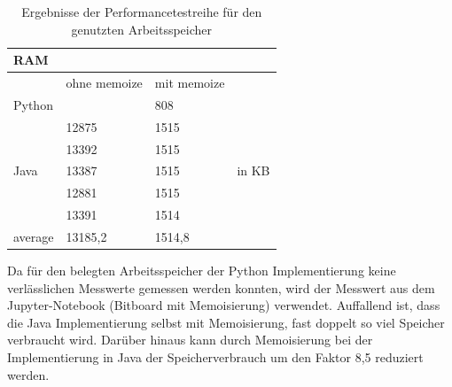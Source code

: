 \begin{table}[H]
    \centering
    \begin{tabular}{|l|ll|l|}
        \hline
        \multicolumn{4}{|l|}{\textbf{RAM}}                                             \\ \hline
                                & ohne memoize & mit memoize &                         \\ \hline
        \multirow{1}{*}{Python} &              & 808         & \multirow{7}{*}{in KB}  \\ \cline{1-3}
        \multirow{5}{*}{Java}   & 12875        & 1515        &                         \\
                                & 13392        & 1515        &                         \\
                                & 13387        & 1515        &                         \\
                                & 12881        & 1515        &                         \\
                                & 13391        & 1514        &                         \\ \cline{1-3}
        average                 & 13185,2      & 1514,8      &                         \\ \hline
    \end{tabular}
    \caption{Ergebnisse der Performancetestreihe für den genutzten Arbeitsspeicher}
\end{table}

Da für den belegten Arbeitsspeicher der Python Implementierung keine verlässlichen Messwerte gemessen werden 
konnten, wird der Messwert aus dem Jupyter-Notebook (Bitboard mit Memoisierung) verwendet. Auffallend ist, 
dass die Java Implementierung selbst mit Memoisierung, fast doppelt so viel Speicher verbraucht wird. 
Darüber hinaus kann durch Memoisierung bei der Implementierung in Java der Speicherverbrauch um den 
Faktor 8,5 reduziert werden.

